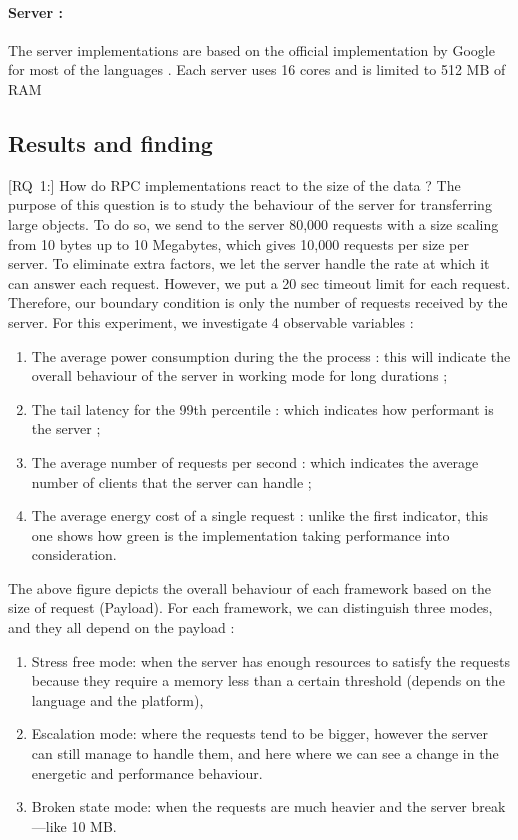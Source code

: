 \paragraph{Server :}
The server implementations are based on the official implementation by Google for most of the languages . Each server uses 16 cores  and is limited to 512 MB of RAM

\subsection{Results and finding}
[\textsc{RQ}~1:] How do RPC implementations react to the size of the data ?
The purpose of this question is to study the behaviour of the server for transferring large objects. To do so, we send to the server 80,000 requests with a size scaling from 10 bytes up to 10 Megabytes, which gives 10,000 requests per size per server. To eliminate extra factors, we let the server handle the rate at which it can answer each request. However, we put a 20 sec timeout limit for each request. Therefore, our boundary condition is only the number of requests received by the server.  For this experiment, we investigate 4 observable variables :
\begin{enumerate}
    \item The average power consumption during the the process : this will indicate the overall behaviour of the server in working mode for long durations ;
    \item The tail latency for the 99th percentile : which indicates how performant is the server ;
    \item The average number of requests per second : which indicates the  average number of clients that  the server can handle ;
    \item The average energy cost of a single request : unlike the first indicator, this one shows how green is the implementation taking performance into consideration.
\end{enumerate}



The above figure depicts the overall behaviour of each framework based on the size of request (Payload). For each framework, we can distinguish three modes, and they all depend on the payload :
\begin{enumerate}
    \item Stress free mode: when the server has enough resources to satisfy the requests because they require a memory less than a certain threshold (depends on the language and the platform),
    \item Escalation mode: where the requests tend to be bigger, however the server can still manage to handle them, and here where we can see a change in the energetic and performance behaviour.
    \item Broken state mode: when the requests are much heavier and the server break—like 10 MB.
\end{enumerate}

